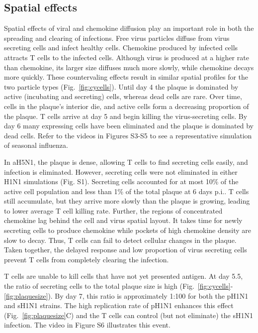 \documentclass[10pt]{article}
\begin{document}
\subsection*{Spatial effects}

Spatial effects of viral and chemokine diffusion play an important role in both the spreading and clearing of infections.  Free virus particles diffuse from virus secreting cells and infect healthy cells.  Chemokine produced by infected cells attracts T cells to the infected cells.  Although virus is produced at a higher rate than chemokine, its larger size diffuses much more slowly, while chemokine decays more quickly.  These countervaling effects result in similar spatial profiles for the two particle types (Fig.~\ref{fig:cycells}). Until day 4 the plaque is dominated by active (incubating and secreting) cells, whereas dead cells are rare. Over time, cells in the plaque's interior die, and active cells form a decreasing proportion of the plaque. T cells arrive at day 5 and begin killing the virus-secreting cells. By day 6 many expressing cells have been eliminated and the plaque is dominated by dead cells.  Refer to the videos in Figures S3-S5 to see a representative simulation of seasonal influenza.

In aH5N1, the plaque is dense, allowing T cells to find secreting cells easily, and infection is eliminated.  However, secreting cells were not eliminated in either H1N1 simulations (Fig. S1).  Secreting cells accounted for at most 10\% of the active cell population and less than 1\% of the total plaque at 6 days p.i..  T cells still accumulate, but they arrive more slowly than the plaque is growing, leading to lower average T cell killing rate.  Further, the regions of concentrated chemokine lag behind the cell and virus spatial layout.  It takes time for newly secreting cells to produce chemokine while pockets of high chemokine density are slow to decay.  Thus, T cells can fail to detect cellular changes in the plaque.  Taken together, the delayed response and low proportion of virus secreting cells prevent T cells from completely clearing the infection.

T cells are unable to kill cells that have not yet presented antigen.  At day 5.5, the ratio of secreting cells to the total plaque size is high (Fig.~\ref{fig:cycells}-\ref{fig:plaquesize}). By day 7, this ratio is approximately 1:100 for both the pH1N1 and sH1N1 strains.  The high replication rate of pH1N1 enhances this effect (Fig.~\ref{fig:plaquesize}C) and the T cells can control (but not eliminate) the sH1N1 infection.  The video in Figure S6 illustrates this event.
\end{document}
